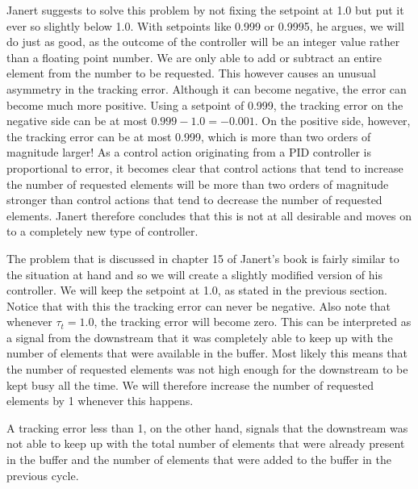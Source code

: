 Janert suggests to solve this problem by not fixing the setpoint at 1.0 but put it ever so slightly below 1.0. With setpoints like 0.999 or 0.9995, he argues, we will do just as good, as the outcome of the controller will be an integer value rather than a floating point number. We are only able to add or subtract an entire element from the number to be requested. This however causes an unusual asymmetry in the tracking error. Although it can become negative, the error can become much more positive. Using a setpoint of 0.999, the tracking error on the negative side can be at most $0.999 - 1.0 = -0.001$. On the positive side, however, the tracking error can be at most 0.999, which is more than two orders of magnitude larger! As a control action originating from a PID controller is proportional to error, it becomes clear that control actions that tend to increase the number of requested elements will be more than two orders of magnitude stronger than control actions that tend to decrease the number of requested elements. Janert therefore concludes that this is not at all desirable and moves on to a completely new type of controller.

The problem that is discussed in chapter 15 of Janert's book is fairly similar to the situation at hand and so we will create a slightly modified version of his controller. We will keep the setpoint at 1.0, as stated in the previous section. Notice that with this the tracking error can never be negative. Also note that whenever $\tau_t = 1.0$, the tracking error will become zero. This can be interpreted as a signal from the downstream that it was completely able to keep up with the number of elements that were available in the buffer. Most likely this means that the number of requested elements was not high enough for the downstream to be kept busy all the time. We will therefore increase the number of requested elements by 1 whenever this happens.

A tracking error less than 1, on the other hand, signals that the downstream was not able to keep up with the total number of elements that were already present in the buffer and the number of elements that were added to the buffer in the previous cycle. 










































